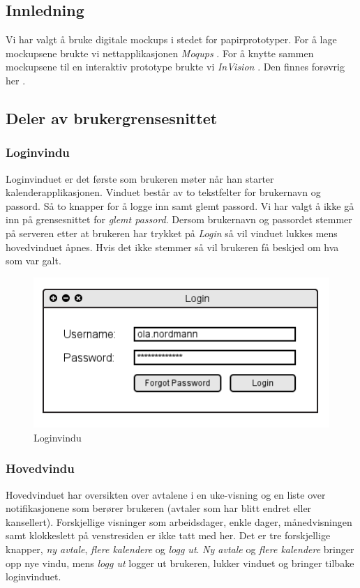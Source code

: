 \subsection{Innledning}
Vi har valgt å bruke digitale mockups i stedet for papirprototyper. For å lage mockupsene brukte vi nettapplikasjonen \emph{Moqups} \cite{moqups}. For å knytte sammen mockupsene til en interaktiv prototype brukte vi \emph{InVision} \cite{invision}. Den finnes forøvrig her \cite{invisio}. 

\subsection{Deler av brukergrensesnittet}
\subsubsection{Loginvindu}
Loginvinduet er det første som brukeren møter når han starter kalenderapplikasjonen. Vinduet består av to tekstfelter for brukernavn og passord. Så to knapper for å logge inn samt glemt passord. Vi har valgt å ikke gå inn på grensesnittet for \emph{glemt passord}. Dersom brukernavn og passordet stemmer på serveren etter at brukeren har trykket på \emph{Login} så vil vinduet lukkes mens hovedvinduet åpnes. Hvis det ikke stemmer så vil brukeren få beskjed om hva som var galt.

\begin{figure}[H]
\centering
\includegraphics[scale=0.65]{images/login.png}
\caption{Loginvindu}
\label{login_image}
\end{figure}

\subsubsection{Hovedvindu}
Hovedvinduet har oversikten over avtalene i en uke-visning og en liste over notifikasjonene som berører brukeren (avtaler som har blitt endret eller kansellert). Forskjellige visninger som arbeidsdager, enkle dager, månedvisningen samt klokkeslett på venstresiden er ikke tatt med her. Det er tre forskjellige knapper, \emph{ny avtale}, \emph{flere kalendere} og \emph{logg ut}. \emph{Ny avtale} og \emph{flere kalendere} bringer opp nye vindu, mens \emph{logg ut} logger ut brukeren, lukker vinduet og bringer tilbake loginvinduet.

